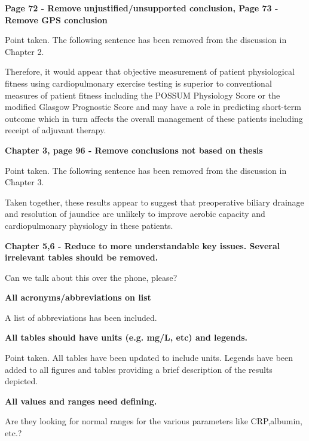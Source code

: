 \documentclass[12pt,a4paper]{article}
\begin{document}
\textbf{Page 72 - Remove unjustified/unsupported conclusion, Page 73 - Remove GPS conclusion}
	
	Point taken. The following sentence has been removed from the discussion in Chapter 2.
	
	Therefore, it would appear that objective measurement of patient physiological fitness using cardiopulmonary exercise testing is superior to conventional measures of patient fitness including the POSSUM Physiology Score or the modified Glasgow Prognostic Score and may have a role in predicting short-term outcome which in turn affects the overall management of these patients including receipt of adjuvant therapy.
	
\textbf{Chapter 3, page 96 - Remove conclusions not based on thesis}
	
	Point taken. The following sentence has been removed from the discussion in Chapter 3.
	
	Taken together, these results appear to suggest that preoperative biliary drainage and resolution of jaundice are unlikely to improve aerobic capacity and cardiopulmonary physiology in these patients.
	
\textbf{Chapter 5,6 - Reduce to more understandable key issues. Several irrelevant tables should be removed.}

	Can we talk about this over the phone, please?
	
\textbf{All acronyms/abbreviations on list}
	
	A list of abbreviations has been included.
	
\textbf{All tables should have units (e.g. mg/L, etc) and legends.}
	
	Point taken. 
	All tables have been updated to include units. 
	Legends have been added to all figures and tables providing a brief description of the results
	depicted.
	
\textbf{All values and ranges need defining.}
	
	Are they looking for normal ranges for the various parameters like CRP,albumin, etc.?
\end{document}
